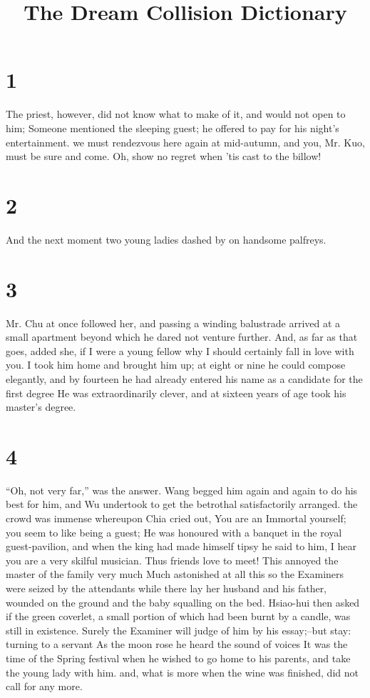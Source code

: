 \documentclass[11pt,a5paper]{book}
\title{The Dream Collision Dictionary}
\author{}\date{}
\begin{document}
\maketitle
\thispagestyle{empty}
\clearpage
\chapter*{\normalfont\Large 1}
The priest, however, did not know what to make of it, and would not open to him; Someone mentioned the sleeping guest; he offered to pay for his night’s entertainment. we must rendezvous here again at mid-autumn, and you, Mr. Kuo, must be sure and come. Oh, show no regret when ’tis cast to the billow!
\clearpage

\chapter*{\normalfont\Large 2}
And the next moment two young ladies dashed by on handsome palfreys.
\clearpage

\chapter*{\normalfont\Large 3}
Mr. Chu at once followed her, and passing a winding balustrade arrived at a small apartment beyond which he dared not venture further. And, as far as that goes, added she, if I were a young fellow why I should certainly fall in love with you. I took him home and brought him up; at eight or nine he could compose elegantly, and by fourteen he had already entered his name as a candidate for the first degree He was extraordinarily clever, and at sixteen years of age took his master’s degree.
\clearpage

\chapter*{\normalfont\Large 4}
“Oh, not very far,” was the answer. Wang begged him again and again to do his best for him, and Wu undertook to get the betrothal satisfactorily arranged. the crowd was immense whereupon Chia cried out, You are an Immortal yourself; you seem to like being a guest; He was honoured with a banquet in the royal guest-pavilion, and when the king had made himself tipsy he said to him, I hear you are a very skilful musician. Thus friends love to meet! This annoyed the master of the family very much Much astonished at all this so the Examiners were seized by the attendants while there lay her husband and his father, wounded on the ground and the baby squalling on the bed. Hsiao-hui then asked if the green coverlet, a small portion of which had been burnt by a candle, was still in existence. Surely the Examiner will judge of him by his essay;--but stay: turning to a servant As the moon rose he heard the sound of voices It was the time of the Spring festival when he wished to go home to his parents, and take the young lady with him. and, what is more when the wine was finished, did not call for any more.
\clearpage
\end{document}
